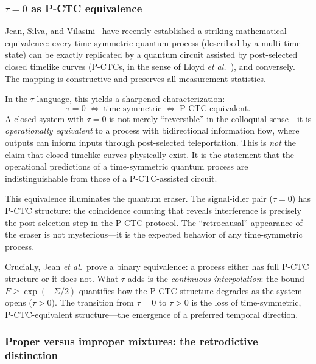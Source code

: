 \documentclass[12pt]{article}
\theoremstyle{definition}
\theoremstyle{remark}
\newcommand{\tauasym}{\tau}
\begin{document}
\subsubsection{$\tauasym = 0$ as P-CTC equivalence}

Jean, Silva, and Vilasini~\cite{Jean2025} have recently established
a striking mathematical equivalence: every time-symmetric quantum
process (described by a multi-time state) can be exactly replicated
by a quantum circuit assisted by post-selected closed timelike
curves (P-CTCs, in the sense of Lloyd \emph{et al.}~\cite{Lloyd2011}),
and conversely.  The mapping is constructive and preserves all
measurement statistics.

In the $\tauasym$ language, this yields a sharpened characterization:
\begin{equation}
\tauasym = 0 \;\Longleftrightarrow\; \text{time-symmetric}
\;\Longleftrightarrow\; \text{P-CTC-equivalent}.
\label{eq:pctc}
\end{equation}
A closed system with $\tauasym = 0$ is not merely ``reversible''
in the colloquial sense---it is \emph{operationally equivalent} to
a process with bidirectional information flow, where outputs can
inform inputs through post-selected teleportation.  This is
\emph{not} the claim that closed timelike curves physically exist.
It is the statement that the operational predictions of a
time-symmetric quantum process are indistinguishable from those of
a P-CTC-assisted circuit.

This equivalence illuminates the quantum eraser.  The signal-idler
pair ($\tauasym = 0$) has P-CTC structure: the coincidence counting
that reveals interference is precisely the post-selection step in the
P-CTC protocol.  The ``retrocausal'' appearance of the eraser is not
mysterious---it is the expected behavior of any time-symmetric process.

Crucially, Jean \emph{et al.}\ prove a binary equivalence:
a process either has full P-CTC structure or it does not.
What $\tauasym$ adds is the \emph{continuous interpolation}:
the bound $F \geq \exp(-\Sigma/2)$ quantifies how the P-CTC
structure degrades as the system opens ($\tauasym > 0$).
The transition from $\tauasym = 0$ to $\tauasym > 0$ is the
loss of time-symmetric, P-CTC-equivalent structure---the emergence
of a preferred temporal direction.

\subsubsection{Proper versus improper mixtures: the retrodictive
distinction}
\end{document}
